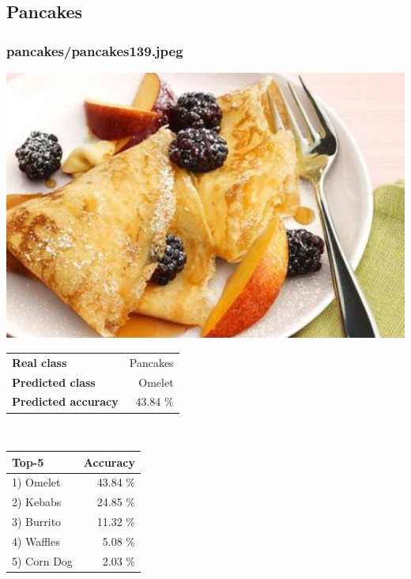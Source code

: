 \subsection{Pancakes}
    
\subsubsection{pancakes/pancakes139.jpeg}

\begin{minipage}[t]{0.4\textwidth}
	\vspace{0pt}
	\includegraphics[width=\linewidth]{images/evaluation-images/pancakes/pancakes139.jpeg}
\end{minipage}
\hfill
\begin{minipage}[t]{0.5\textwidth}
	\vspace{0pt}\raggedright
	\begin{tabularx}{\textwidth}{X r}
		\small \textbf{Real class} & \small Pancakes\\
		\small \textbf{Predicted class} & \small Omelet\\
		\small \textbf{Predicted accuracy} & \small 43.84 \%
    \end{tabularx}\\
    
    \vspace{6pt}
	\begin{tabularx}{\textwidth}{X r}
        \small \textbf{Top-5} & \small \textbf{Accuracy} \\
        \hline
		\small 1) Omelet & \small 43.84 \%\\\small 2) Kebabs & \small 24.85 \%\\\small 3) Burrito & \small 11.32 \%\\\small 4) Waffles & \small 5.08 \%\\\small 5) Corn Dog & \small 2.03 \%
    \end{tabularx}
\end{minipage}
    
